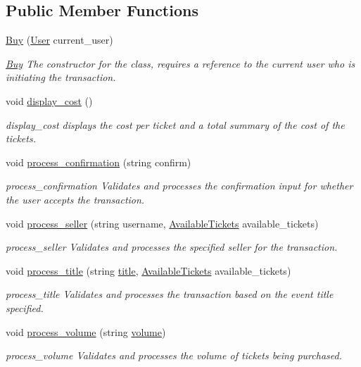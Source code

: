 \subsection*{Public Member Functions}
\begin{DoxyCompactItemize}
\item 
\hyperlink{class_buy_af64c082bb6e6faa31f6176daaaf6ee9c}{Buy} (\hyperlink{class_user}{User} current\-\_\-user)
\begin{DoxyCompactList}\small\item\em \hyperlink{class_buy}{Buy} The constructor for the class, requires a reference to the current user who is initiating the transaction. \end{DoxyCompactList}\item 
void \hyperlink{class_buy_a34d2435f657e8a28db2950343206f87a}{display\-\_\-cost} ()
\begin{DoxyCompactList}\small\item\em display\-\_\-cost displays the cost per ticket and a total summary of the cost of the tickets. \end{DoxyCompactList}\item 
void \hyperlink{class_buy_a1a848e03cb750d1df2e393f0a28742aa}{process\-\_\-confirmation} (string confirm)
\begin{DoxyCompactList}\small\item\em process\-\_\-confirmation Validates and processes the confirmation input for whether the user accepts the transaction. \end{DoxyCompactList}\item 
void \hyperlink{class_buy_a618b3b65c7438cec7a8dc10d9176f397}{process\-\_\-seller} (string username, \hyperlink{class_available_tickets}{Available\-Tickets} available\-\_\-tickets)
\begin{DoxyCompactList}\small\item\em process\-\_\-seller Validates and processes the specified seller for the transaction. \end{DoxyCompactList}\item 
void \hyperlink{class_buy_a178c9b58b5d6e9eff49a075583d0e565}{process\-\_\-title} (string \hyperlink{class_buy_a43a5eafe64b96968035e5a4013e47c75}{title}, \hyperlink{class_available_tickets}{Available\-Tickets} available\-\_\-tickets)
\begin{DoxyCompactList}\small\item\em process\-\_\-title Validates and processes the transaction based on the event title specified. \end{DoxyCompactList}\item 
void \hyperlink{class_buy_a2ebcdb886e993032835b7c621588ac76}{process\-\_\-volume} (string \hyperlink{class_buy_aed48ca0bcd2162fd4fd495873e2631f5}{volume})
\begin{DoxyCompactList}\small\item\em process\-\_\-volume Validates and processes the volume of tickets being purchased. \end{DoxyCompactList}\end{DoxyCompactItemize}
